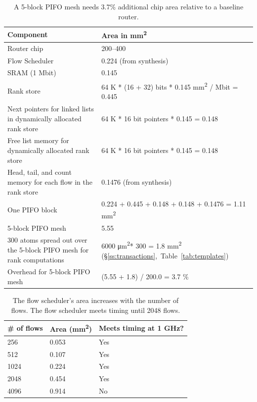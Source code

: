 \begin{table}[!h]
  \centering
  \begin{small}
  \begin{tabular}{|p{}|p{}|}
  \hline
  Component & Area in \si{\milli\metre\squared}\\
  \hline
  Router chip & 200--400~\cite{glen_parsing} \\
  \hline
  Flow Scheduler & 0.224 (from synthesis) \\
  \hline
  SRAM (1 Mbit) & 0.145~\cite{sram_estimate} \\
  \hline
  Rank store & 64 K * (16 + 32) bits * 0.145 \si{\milli\metre\squared} / Mbit = 0.445 \\
  \hline
  Next pointers for linked lists in dynamically allocated rank store & 64 K * 16 bit pointers * 0.145 = 0.148 \\
  \hline
  Free list memory for dynamically allocated rank store & 64 K * 16 bit pointers * 0.145 = 0.148 \\
  \hline
  Head, tail, and count memory for each flow in the rank store & 0.1476 (from synthesis) \\
  \hline
  One PIFO block & 0.224 + 0.445 + 0.148 + 0.148 + 0.1476 = 1.11 \si{\milli\metre\squared} \\
  \hline
  5-block PIFO mesh & 5.55 \\
  \hline
  300 atoms spread out over the 5-block PIFO mesh for rank computations & 6000 \si{\micro\metre\squared}* 300 = 1.8 \si{\milli\metre\squared} (\S\ref{ss:transactions},~Table~\ref{tab:templates})\\
  \hline
  Overhead for 5-block PIFO mesh & (5.55 + 1.8) / 200.0 = 3.7 \% \\
  \hline
  \end{tabular}
\end{small}
\caption{A 5-block PIFO mesh needs 3.7\% additional chip area relative to
a baseline router.}
\label{tab:area_overheads}
\end{table}

\begin{table}
\centering
\begin{small}
\begin{tabular}{|p{}|p{}|p{}|}
\hline
\# of flows & Area (mm\textsuperscript{2}) & Meets timing at 1 GHz? \\
\hline
256 & 0.053 & Yes \\
\hline
512 & 0.107 & Yes \\
\hline
1024 & 0.224 & Yes \\
\hline
2048 & 0.454 & Yes \\
\hline
4096 & 0.914 & No \\
\hline
\end{tabular}
\end{small}
\caption{The flow scheduler's area increases with the number of
flows. The flow scheduler meets timing until 2048 flows.}
\label{tab:num_flows}
\end{table}

